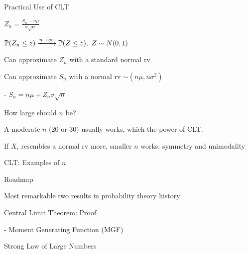 \documentclass[fleqn,aspectratio=169]{beamer}
\begin{document}
\begin{frame}{Practical Use of CLT}

$Z_n = \frac{S_n - n\mu}{\sigma \sqrt{n}}$

$\mathbb{P}( Z_n \le z ) \xrightarrow{n \rightarrow \infty} \mathbb{P}( Z \le z ), \ Z \sim N(0,1)$

\plitemsep 0.1in
\bci 
\item<2-> Can approximate $Z_n$ with a standard normal rv
\item<4-> Can approximate $S_n$ with a normal rv $\sim  (n\mu, n\sigma^2)$

- $S_n = n \mu + Z_n\sigma\sqrt{n}$
\item<5-> How large should $n$ be?
\bci
\item<6-> A moderate $n$ (20 or 30) usually works, which the power of CLT.

\item<7-> If $X_i$ resembles a normal rv more, smaller $n$ works: symmetry and unimodality\footnotemark
{}
\eci
\eci 


\end{frame}


\begin{frame}{CLT: Examples of $n$}

\centering
{}


\end{frame}



\begin{frame}{Roadmap}

\plitemsep 0.1in

\bci 
\item Most remarkable two results in probability theory history

\bigskip

\item {}
\item {}
\item {}

\item Central Limit Theorem: Proof

- Moment Generating Function (MGF)

\item Strong Law of Large Numbers
\eci 

\end{frame}
\end{document}
